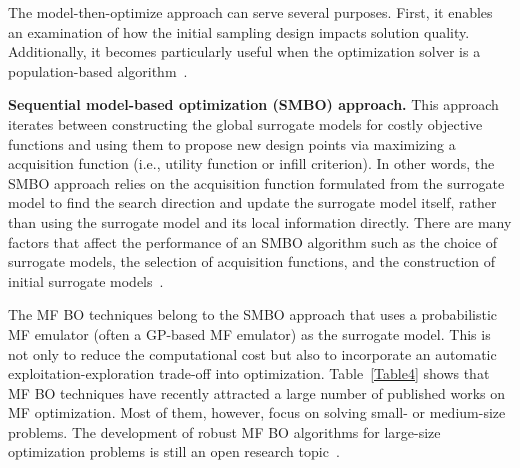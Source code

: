 \documentclass[iicol,sn-basic]{sn-jnl}%
\theoremstyle{thmstyleone}%
\theoremstyle{thmstyletwo}
\theoremstyle{thmstylethree}
\begin{document}
\begin{linenumbers}
The model-then-optimize approach can serve several purposes.
First, it enables an examination of how the initial sampling design impacts solution quality.
Additionally, it becomes particularly useful when the optimization solver is a population-based algorithm~\citep{Viana2009,Leusink2015,Singh2017,Yang2018}.

\textbf{Sequential model-based optimization (SMBO) approach.} This approach iterates between constructing the global surrogate models for costly objective functions and using them to propose new design points via maximizing a acquisition function (i.e., utility function or infill criterion).
In other words, the SMBO approach relies on the acquisition function formulated from the surrogate model to find the search direction and update the surrogate model itself, rather than using the surrogate model and its local information directly.
There are many factors that affect the performance of an SMBO algorithm such as the choice of surrogate models, the selection of acquisition functions, and the construction of initial surrogate models~\citep{Bossek2020}.

The MF BO techniques belong to the SMBO approach that uses a probabilistic MF emulator (often a GP-based MF emulator) as the surrogate model.
This is not only to reduce the computational cost but also to incorporate an automatic exploitation-exploration trade-off into optimization.
Table~\ref{Table4} shows that MF BO techniques have recently attracted a large number of published works on MF optimization.
Most of them, however, focus on solving small- or medium-size problems.
The development of robust MF BO algorithms for large-size optimization problems is still an open research topic~\citep{Frazier2018}. 


\end{linenumbers}
\end{document}
